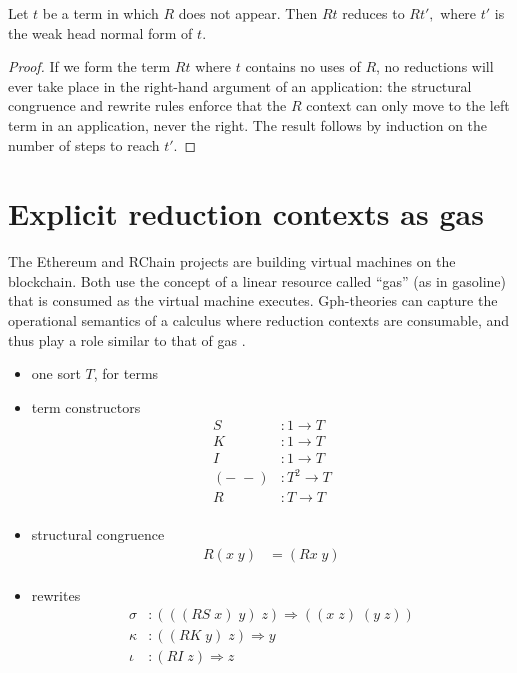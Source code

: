 \documentclass[a4paper,UKenglish]{lipics-v2016}
\begin{document}
\begin{theorem}
  Let $t$ be a term in which $R$ does not appear.  Then $Rt$ reduces to $Rt',$ where $t'$ is the weak head normal form of $t.$
\end{theorem}

\begin{proof}
If we form the term $Rt$ where $t$ contains no uses of $R$, no reductions will ever take place in the right-hand argument of an application: the structural congruence and rewrite rules enforce that the $R$ context can only move to the left term in an application, never the right.  The result follows by induction on the number of steps to reach $t'.$
\end{proof}

\section{Explicit reduction contexts as gas}
The Ethereum \cite{wood2014ethereum} and RChain \cite{RChain} projects are building virtual machines on the blockchain.  Both use the concept of a linear resource called ``gas'' (as in gasoline) that is consumed as the virtual machine executes.  Gph-theories can capture the operational semantics of a calculus where reduction contexts are consumable, and thus play a role similar to that of gas \cite{DBLP:journals/corr/StayM15}.

\begin{itemize}
  \item one sort $T$, for terms
  \item term constructors
  \[\begin{array}{rl}
    S&:1 \to T\\
    K&:1 \to T\\
    I&:1 \to T\\
    (-\; -)&: T^2 \to T\\
    R&:T \to T\\
  \end{array}\]
  \item structural congruence
  \[\begin{array}{rl}
    R(x\; y) &= (Rx\; y)\\
  \end{array}\]
  \item rewrites
  \[\begin{array}{rl}
    \sigma&:(((RS\; x)\; y)\; z) \Rightarrow ((x\; z)\; (y\; z))\\
    \kappa&:((RK\; y)\; z) \Rightarrow y\\
    \iota&:(RI\; z) \Rightarrow z\\
  \end{array}\]
\end{itemize}
\end{document}
